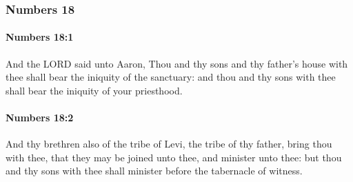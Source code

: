 	\subsubsection{Numbers 18} %
		\label{NUMBERS-18}

		\paragraph{Numbers 18:1} %
			\label{NUMBERS-18-1}

			And the LORD said unto Aaron, Thou and thy sons and thy father’s house with thee shall bear the iniquity of the sanctuary: and thou and thy sons with thee shall bear the iniquity of your priesthood.


		\paragraph{Numbers 18:2} %
			\label{NUMBERS-18-2}

			And thy brethren also of the tribe of Levi, the tribe of thy father, bring thou with thee, that they may be joined unto thee, and minister unto thee: but thou and thy sons with thee shall minister before the tabernacle of witness.

